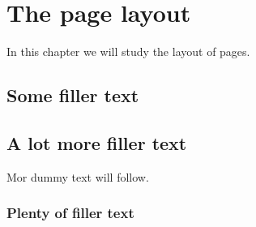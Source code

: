 \documentclass[a4paper,12pt]{book}
\begin{document}
\tableofcontents
\chapter[Page layout]{The page layout}
In this chapter we will study the layout of pages.
\section[Filler text]{Some filler text}
\blindtext
\section[More]{A lot more filler text}
Mor dummy text will follow.
\subsection[Plenty]{Plenty of filler text}
\blindtext[10]
\end{document}
